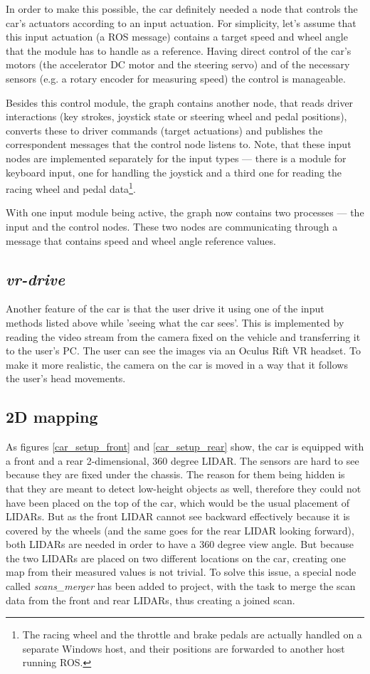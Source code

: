 In order to make this possible, the car definitely needed a node that controls the car's actuators according to an input actuation. For simplicity, let's assume that this input actuation (a ROS message) contains a target speed and wheel angle that the module has to handle as a reference. Having direct control of the car's motors (the accelerator DC motor and the steering servo) and of the necessary sensors (e.g. a rotary encoder for measuring speed) the control is manageable.

Besides this control module, the graph contains another node, that reads driver interactions (key strokes, joystick state or steering wheel and pedal positions), converts these to driver commands (target actuations) and publishes the correspondent messages that the control node listens to. Note, that these input nodes are implemented separately for the input types --- there is a module for keyboard input, one for handling the joystick and a third one for reading the racing wheel and pedal data\footnote{The racing wheel and the throttle and brake pedals are actually handled on a separate Windows host, and their positions are forwarded to another host running ROS.}.

With one input module being active, the graph now contains two processes --- the input and the control nodes. These two nodes are communicating through a message that contains speed and wheel angle reference values.

\subsection{\textit{vr-drive}}
Another feature of the car is that the user drive it using one of the input methods listed above while 'seeing what the car sees'. This is implemented by reading the video stream from the camera fixed on the vehicle and transferring it to the user's PC. The user can see the images via an Oculus Rift VR headset. To make it more realistic, the camera on the car is moved in a way that it follows the user's head movements.

\subsection{2D mapping}
As figures \ref{car_setup_front} and \ref{car_setup_rear} show, the car is equipped with a front and a rear 2-dimensional, 360 degree LIDAR. The sensors are hard to see because they are fixed under the chassis. The reason for them being hidden is that they are meant to detect low-height objects as well, therefore they could not have been placed on the top of the car, which would be the usual placement of LIDARs. But as the front LIDAR cannot see backward effectively because it is covered by the wheels (and the same goes for the rear LIDAR looking forward), both LIDARs are needed in order to have a 360 degree view angle. But because the two LIDARs are placed on two different locations on the car, creating one map from their measured values is not trivial. To solve this issue, a special node called \textit{scans\_merger} has been added to project, with the task to merge the scan data from the front and rear LIDARs, thus creating a joined scan.

